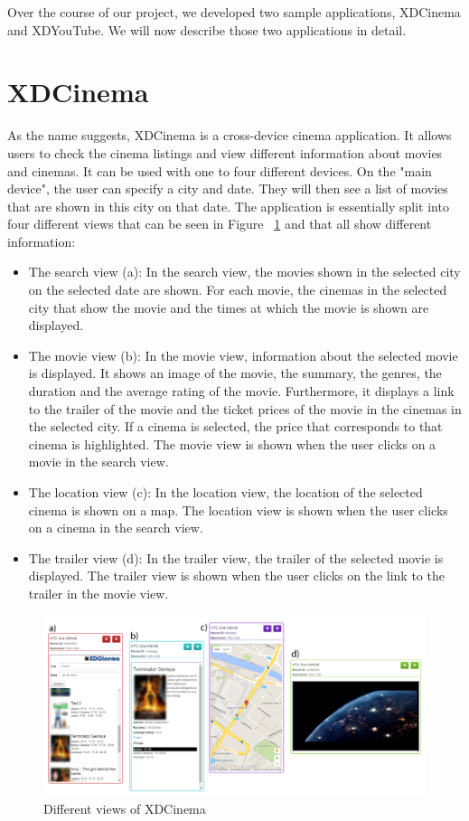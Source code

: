 Over the course of our project, we developed two sample applications, XDCinema and XDYouTube. We will now describe those two applications in detail.

\section{XDCinema}

As the name suggests, XDCinema is a cross-device cinema application. It allows users to check the cinema listings and view different information about movies and cinemas. It can be used with one to four different devices. On the "main device", the user can specify a city and date. They will then see a list of movies that are shown in this city on that date. The application is essentially split into four different views that can be seen in Figure ~\ref{fig:xdcinema} and that all show different information:
\begin{itemize}
	\item The search view (a): In the search view, the movies shown in the selected city on the selected date are shown. For each movie, the cinemas in the selected city that show the movie and the times at which the movie is shown are displayed.
	\item The movie view (b): In the movie view, information about the selected movie is displayed. It shows an image of the movie, the summary, the genres, the duration and the average rating of the movie. Furthermore, it displays a link to the trailer of the movie and the ticket prices of the movie in the cinemas in the selected city. If a cinema is selected, the price that corresponds to that cinema is highlighted. The movie view is shown when the user clicks on a movie in the search view.
	\item The location view (c): In the location view, the location of the selected cinema is shown on a map. The location view is shown when the user clicks on a cinema in the search view.
	\item The trailer view (d): In the trailer view, the trailer of the selected movie is displayed. The trailer view is shown when the user clicks on the link to the trailer in the movie view.
\end{itemize}

\begin{figure}[H]
  \centering
    \includegraphics[width=1.0\textwidth]{images/screenshots/xdcinema_3_labeled_2.png}
	\caption{Different views of XDCinema}
	\label{fig:xdcinema}
\end{figure}

